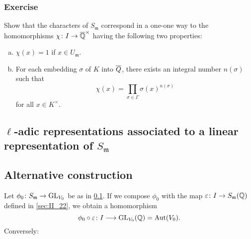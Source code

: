 \subsubsection*{Exercise}
Show that the characters of $S_{\mathfrak{m}}$ correspond in a one-one way to
the homomorphisms $\chi \colon I \to \overline{\mathbb{Q}}^\times$ having the following
two properties:
\begin{enumerate}[(a)]
\item $\chi(x) = 1$ if $x \in U_{\mathfrak{m}}$.
\item For each embedding $\sigma$ of $K$ into $\overline{Q}$, there exists an
	integral number $n(\sigma)$ such that
	\[
		\chi(x) = \prod_{\sigma \in \Gamma} \sigma(x)^{n(\sigma)}
	\]
	for all $x \in K^\times$.
\end{enumerate}

\subsection{\texorpdfstring{$\ell$}{ℓ}-adic representations associated to a
linear representation of \texorpdfstring{$S_{\mathfrak{m}}$}{Sm}}
\label{sec:II_25}

\subsection{Alternative construction}
Let $\phi_0 \colon S_{\mathfrak{m}} \to \operatorname{GL}_{V_0}$ be as in \ref{sec:II_25}. If
we compose $\phi_0$ with the map $\varepsilon \colon I \to
S_{\mathfrak{m}}(\mathbb{Q})$ defined in \ref{sec:II_22}, we obtain a homomorphism
\[
	\phi_0 \circ \varepsilon \colon I \longrightarrow \operatorname{GL}_{V_0}(\mathbb{Q}) =
	\operatorname{Aut}(V_0).
\]
Conversely:
\dpage

